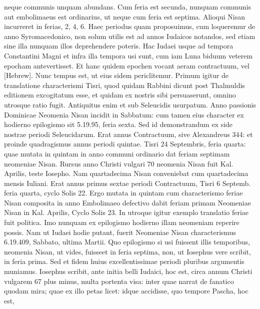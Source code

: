 neque communis unquam abundans.
%
Cum feria est secunda, nunquam
communis aut embolimaeus est ordinarius, ut neque cum feria
est septima.
Alioqui Nisan incurreret in ferias, 2, 4, 6.
Haec periodus
quam proposuimus, cum loqueremur de anno Syromacedonico, non
solum utilis est ad annos Iudaicos notandos, sed etiam sine illa nunquam
illos deprehendere poteris.
Hac Iudaei usque ad tempora Constantini
Magni et infra illa tempora usi sunt, cum iam Luna biduum
veterem epocham antevertisset.
Et hanc quidem epochen vocant
aeram contractuum, vel \texthebrew{}[Hebrew].
Nunc tempus est, ut eius sidem periclitemur.
Primum igitur de translatione characterismi Tisri, quod
quidam Rabbini dicunt post Thalmuldis editionem excogitatum esse,
et quidam ex nostris sibi persuaserunt, omnino utrosque ratio fugit.
Antiquitus enim et sub Seleucidis usurpatum.
Anno passionis Dominicae
Neomenia Nisan incidit in Sabbatum: cum tamen eius character
ex hodierno epilogismo sit 5.19.95, feria sexta.
Sed id demonstrandum
ex side nostrae periodi Seleucidarum.
Erat annus Contractuum,
sive Alexandreus 344: et proinde quadragismus annus periodi
quintae. %
Tisri 24 Septembris, feria quarta: quae mutata in quintam
in anno communi ordinario dat feriam septimam neomeniae Nisan.
Rursus anno Christi vulgari 70 neomenia Nisan fuit Kal. %
 Aprilis, teste
Iosepho.
Nam quartadecima Nisan conveniebat cum quartadecima
mensis Iuliani.
Erat annus primus sextae periodi Contractuum, Tisri
6 Septemb. %
 feria quarta, cyclo Solis 22.
Ergo mutata in quintam
cum characterismo feriae Nisan composita in anno Embolimaeo defectivo
dabit feriam primam Neomeniae Nisan in Kal. %
 Aprilis, Cyclo
Solis 23.
In utroque igitur exemplo translatio feriae fuit politica.
Imo
nunquam ex epilogismo hodierno illam neomeniam reperire possis.
Nam ut Iudaei hodie putant, fuerit Neomeniae Nisan characterismus
6.19.409, Sabbato, ultima Martii.
Quo epilogismo si usi fuissent illis
temporibus, neomenia Nisan, ut vides, fuisseet in feria septima, non, ut
Iosephus vere scribit, in feria prima.
Sed et fidem huius excellentissimae
periodi pluribus argumentis muniamus.
Iosephus scribit, ante
initia belli Iudaici, hoc est, circa annum Christi vulgarem 67 plus minus,
multa portenta visa: inter quae narrat de fanatico quodam mira;
quae ex illo petas licet: idque accidisse, quo tempore Pascha, hoc est,
